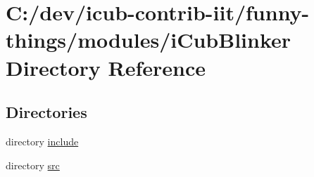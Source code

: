 \section{C\+:/dev/icub-\/contrib-\/iit/funny-\/things/modules/i\+Cub\+Blinker Directory Reference}
\label{dir_168c181400fec304cc264e27f0466640}
\subsection*{Directories}
\begin{DoxyCompactItemize}
\item 
directory \hyperlink{dir_d1c5d33e82b2165aa000afd36ba7d595}{include}
\item 
directory \hyperlink{dir_8b48ebb685241ce8c8f92ab0da5f32f9}{src}
\end{DoxyCompactItemize}
